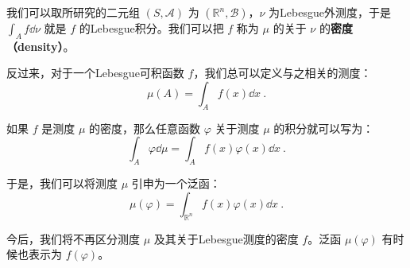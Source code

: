 我们可以取所研究的二元组 $(S, \mathcal{A})$ 为 $(\mathbb{R}^n, \mathcal{B})$，$\nu$ 为Lebesgue外测度，于是 $\int_A f \dd \nu$ 就是 $f$ 的Lebesgue积分。我们可以把 $f$ 称为 $\mu$ 的关于 $\nu$ 的\textbf{密度（density）}。

反过来，对于一个Lebesgue可积函数 $f$，我们总可以定义与之相关的测度：
\begin{equation}
\mu(A) = \int_A f(x) \dd x~.
\end{equation}

如果 $f$ 是测度 $\mu$ 的密度，那么任意函数 $\varphi$ 关于测度 $\mu$ 的积分就可以写为：
\begin{equation}
\int_A \varphi \dd \mu = \int_A f(x)\varphi(x) \dd x~.
\end{equation}

于是，我们可以将测度 $\mu$ 引申为一个泛函：
\begin{equation}
\mu(\varphi) = \int_{\mathbb{R}^n} f(x)\varphi(x) \dd x~.
\end{equation}

今后，我们将不再区分测度 $\mu$ 及其关于Lebesgue测度的密度 $f$。泛函 $\mu(\varphi)$ 有时候也表示为 $f(\varphi)$。












